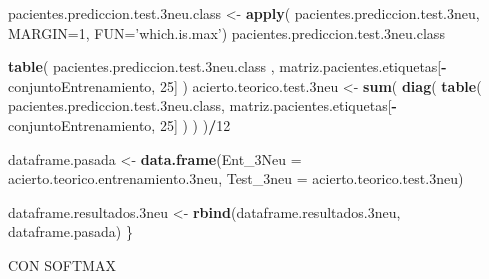 \documentclass[]{article}
\newenvironment{Shaded}{\begin{snugshade}}{\end{snugshade}}
\newcommand{\KeywordTok}[1]{\textcolor[rgb]{0.13,0.29,0.53}{\textbf{#1}}}
\newcommand{\DataTypeTok}[1]{\textcolor[rgb]{0.13,0.29,0.53}{#1}}
\newcommand{\DecValTok}[1]{\textcolor[rgb]{0.00,0.00,0.81}{#1}}
\newcommand{\StringTok}[1]{\textcolor[rgb]{0.31,0.60,0.02}{#1}}
\newcommand{\OperatorTok}[1]{\textcolor[rgb]{0.81,0.36,0.00}{\textbf{#1}}}
\newcommand{\NormalTok}[1]{#1}
\begin{document}
\begin{Shaded}
\begin{Highlighting}[]
\NormalTok{  pacientes.prediccion.test.3neu.class <-}\StringTok{ }\KeywordTok{apply}\NormalTok{( pacientes.prediccion.test.3neu, }\DataTypeTok{MARGIN=}\DecValTok{1}\NormalTok{, }\DataTypeTok{FUN=}\StringTok{'which.is.max'}\NormalTok{)}
\NormalTok{  pacientes.prediccion.test.3neu.class}
  
  \KeywordTok{table}\NormalTok{( pacientes.prediccion.test.3neu.class , matriz.pacientes.etiquetas[}\OperatorTok{-}\NormalTok{conjuntoEntrenamiento, }\DecValTok{25}\NormalTok{] )}
\NormalTok{  acierto.teorico.test.3neu <-}\StringTok{ }\KeywordTok{sum}\NormalTok{( }\KeywordTok{diag}\NormalTok{( }\KeywordTok{table}\NormalTok{( pacientes.prediccion.test.3neu.class, matriz.pacientes.etiquetas[}\OperatorTok{-}\NormalTok{conjuntoEntrenamiento, }\DecValTok{25}\NormalTok{] ) ) )}\OperatorTok{/}\DecValTok{12}
  
  
\NormalTok{  dataframe.pasada <-}\StringTok{ }\KeywordTok{data.frame}\NormalTok{(}\DataTypeTok{Ent_3Neu =}\NormalTok{ acierto.teorico.entrenamiento.3neu,}
                                 \DataTypeTok{Test_3neu =}\NormalTok{ acierto.teorico.test.3neu)}
  
\NormalTok{  dataframe.resultados.3neu <-}\StringTok{ }\KeywordTok{rbind}\NormalTok{(dataframe.resultados.3neu, dataframe.pasada)}
\NormalTok{\}}
\end{Highlighting}
\end{Shaded}

CON SOFTMAX
\end{document}
